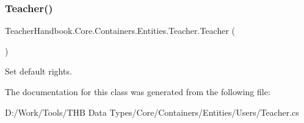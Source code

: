 \subsubsection{\texorpdfstring{Teacher()}{Teacher()}}
{\footnotesize\ttfamily Teacher\+Handbook.\+Core.\+Containers.\+Entities.\+Teacher.\+Teacher (\begin{DoxyParamCaption}{ }\end{DoxyParamCaption})}

Set default rights. 

The documentation for this class was generated from the following file\+:\begin{DoxyCompactItemize}
\item 
D\+:/\+Work/\+Tools/\+T\+H\+B Data Types/\+Core/\+Containers/\+Entities/\+Users/Teacher.\+cs\end{DoxyCompactItemize}
